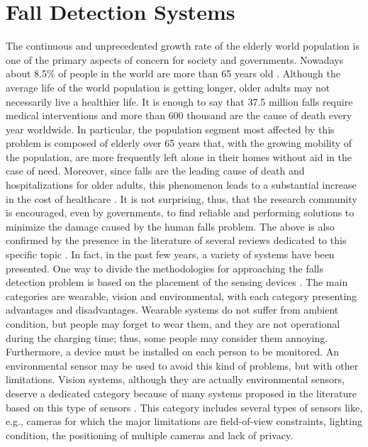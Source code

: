 \section{Fall Detection Systems}
\label{sec:fds}
The continuous and unprecedented growth rate of the elderly world population is one of the primary aspects of concern for society and governments. Nowadays about 8.5\% of people in the world are more than 65 years old \cite{dhhsOlderPop,Carone2006}. Although the average life of the world population is getting longer, older adults may not necessarily live a healthier life. It is enough to say that 37.5 million falls require medical interventions and more than 600 thousand are the cause of death every year worldwide. In particular, the population segment most affected by this problem is composed of elderly over 65 years that, with the growing mobility of the population, are more frequently left alone in their homes without aid in the case of need. Moreover, since falls are the leading cause of death and hospitalizations for older adults, this phenomenon leads to a substantial increase in the cost of healthcare \cite{whoFall, mubashir2013survey}. 
It is not surprising, thus, that the research community is encouraged, even by governments, to find reliable and performing solutions to minimize the damage caused by the human falls problem. The above is also confirmed by the presence in the literature of several reviews dedicated to this specific topic \cite{mubashir2013survey, khan2017review, lapierre2017state, pannurat2014automatic, xu2018new, el2013fall}.
In fact, in the past few years, a variety of systems have been presented. One way to divide the methodologies for approaching the falls detection problem is based on the placement of the sensing devices \cite{mubashir2013survey}. The main categories are wearable, vision and environmental, with each category presenting advantages and disadvantages. Wearable systems do not suffer from ambient condition, but people may forget to wear them, and they are not operational during the charging time; thus, some people may consider them annoying. Furthermore, a device must be installed on each person to be monitored. An environmental sensor may be used to avoid this kind of problems, but with other limitations. Vision systems, although they are actually environmental sensors, deserve a dedicated category because of many systems proposed in the literature based on this type of sensors \cite{mubashir2013survey}. This category includes several types of sensors like, e.g., cameras for which the major limitations are field-of-view constraints, lighting condition, the positioning of multiple cameras and lack of privacy.
